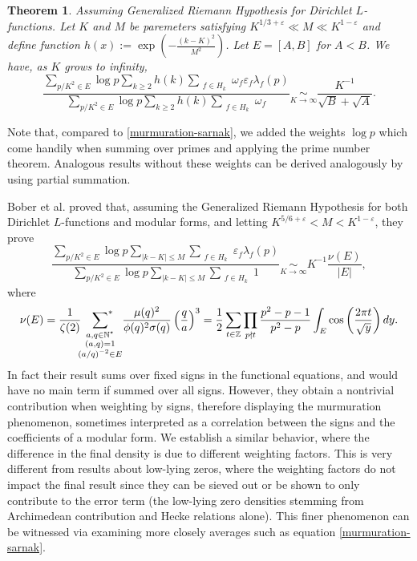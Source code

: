 \documentclass[reqno, 12pt]{amsart}
\newtheorem{thm}{Theorem}
\renewcommand{\leq}{\leqslant}
\begin{document}
 \begin{thm}
 \label{thm:thm}
Assuming Generalized Riemann Hypothesis for Dirichlet $L$-functions. Let $K$ and $M$ be paremeters satisfying $K^{1/3+\varepsilon} \ll M \ll K^{1-\varepsilon}$ and define function $h(x) := \exp(-\tfrac{(k-K)^2}{M^2})$. Let $E = [A,B]$ for $A < B$. We have, as $K$ grows to infinity, 
\begin{equation}
\label{eq:thm}
\frac{\displaystyle\sum_{p/K^2\in E} \log p \sum_{k \geqslant 2} h(k) \sum_{\substack{f \in H_k}} \omega_f \varepsilon_f \lambda_f(p) }{\displaystyle\sum_{p/K^2\in E}  \log p \sum_{k \geqslant 2} h(k) \sum_{\substack{f \in H_k}} \omega_f } \underset{
{K \to \infty}}{\sim} \frac{K^{-1}}{\sqrt{B} + \sqrt{A}}.
\end{equation}
 \end{thm}
 Note that, compared to \eqref{murmuration-sarnak}, we added the weights $\log p$ which come handily when summing over primes and applying the prime number theorem. Analogous results without these weights can be derived analogously by using partial summation.
 
Bober et al. \cite{bober_murmurations_2023} proved that, assuming the Generalized Riemann Hypothesis for both Dirichlet $L$-functions and modular forms, and letting $K^{5/6+\varepsilon} < M < K^{1-\varepsilon}$, they prove
\begin{equation}
\label{eq:thm-bober}
\frac{\displaystyle\sum_{p/K^2\in E}  \log p \sum_{{|k-K| \leq M}} \sum_{\substack{f \in H_k}}  \varepsilon_f \lambda_f(p)}{\displaystyle\sum_{p/K^2\in E}  \log p  \sum_{{|k-K| \leq M}} \sum_{\substack{f \in H_k}} 1 } \underset{{K \to \infty}}{\sim} K^{-1} \frac{\nu(E)}{|E|}, 
\end{equation}
where 
\begin{equation}
\nu(E) = \frac{1}{\zeta(2)} {\sideset{}{^*}\sum_{\substack{a, q \in \mathbb{N}^\star \\ (a,q) = 1 \\ (a/q)^{-2} \in E}}} \frac{\mu(q)^2}{\phi(q)^2\sigma(q)} \left( \frac{q}{a}\right)^3 = \frac{1}{2}\sum_{t\in \mathbb{Z}} \prod_{p \nmid t} \frac{p^2-p-1}{p^2-p}\int_E \cos\left( \frac{2\pi t}{\sqrt{y}} \right)dy.
\end{equation}
	In fact their result sums  over fixed signs in the functional equations, and would have no main term if summed over all signs. However, they obtain a nontrivial contribution when weighting by signs, therefore displaying the murmuration phenomenon, sometimes interpreted as a correlation between the signs and the coefficients of a modular form. We {establish} a similar behavior, {where the difference in the final density is due to different weighting factors}. This is {very different from} results about low-lying zeros, where the {weighting factors} do not impact the final result since they can {be} sieved out \cite{iwaniec_low_2000} {or be shown to only} contribute to the error term (the low-lying zero densities stemming from Archimedean contribution and Hecke relations alone). {This finer phenomenon can be witnessed via examining more closely averages such as equation \eqref{murmuration-sarnak}.}
	
\end{document}
